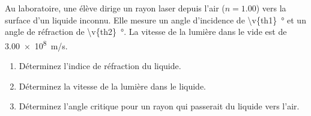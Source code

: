 Au laboratoire, une élève dirige un rayon laser depuis l'air ($n = \num{1.00}$) vers la surface d'un liquide inconnu. Elle mesure un angle d'incidence de \qty{\v{th1}}{\degree} et un angle de réfraction de \qty{\v{th2}}{\degree}. La vitesse de la lumière dans le vide est de \qty{3.00e8}{m/s}.

\begin{enumerate}[label=\alph*)]
    \item Déterminez l'indice de réfraction du liquide.
    \item Déterminez la vitesse de la lumière dans le liquide.
    \item Déterminez l'angle critique pour un rayon qui passerait du liquide vers l'air.
\end{enumerate}
